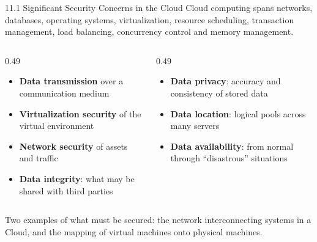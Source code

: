 \documentclass[11pt,aspectratio=169]{beamer}
\newcommand{\kw}[1]{\textbf{\color{accent}#1}}
\begin{document}
\begin{frame}{11.1 Significant Security Concerns in the Cloud}
  \small
  Cloud computing spans networks, databases, operating systems,
  virtualization, resource scheduling, transaction management, load balancing,
  concurrency control and memory management.
  \vspace{0.8em}

  \begin{columns}[T,onlytextwidth]
    \begin{column}{0.49\textwidth}
      \begin{itemize}\small\setlength{\itemsep}{0.45em}
        \item \kw{Data transmission} over a communication medium
        \item \kw{Virtualization security} of the virtual environment
        \item \kw{Network security} of assets and traffic
        \item \kw{Data integrity}: what may be shared with third parties
      \end{itemize}
    \end{column}
    \begin{column}{0.49\textwidth}
      \begin{itemize}\small\setlength{\itemsep}{0.45em}
        \item \kw{Data privacy}: accuracy and consistency of stored data
        \item \kw{Data location}: logical pools across many servers
        \item \kw{Data availability}: from normal through ``disastrous''
              situations
      \end{itemize}
    \end{column}
  \end{columns}
  \vspace{0.7em}
  {\footnotesize\color{accentmid}
  Two examples of what must be secured: the network interconnecting systems in
  a Cloud, and the mapping of virtual machines onto physical machines.}
\end{frame}
\end{document}
